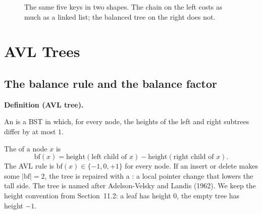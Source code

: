 \documentclass[11pt]{article}
\theoremstyle{definition}
\newenvironment{definitionbox}[1]{%
  \par\noindent\textbf{Definition (#1).}\ \itshape
}{\par\vspace{0.3em}}
\begin{document}
\begin{figure}[h]
  \centering
  \caption{The same five keys in two shapes. The chain on the left costs as
    much as a linked list; the balanced tree on the right does not.}
  \label{fig:chain}
\end{figure}

\section{AVL Trees}

\subsection{The balance rule and the balance factor}

\begin{definitionbox}{AVL tree}
An  is a BST in which, for every node, the heights of the left
and right subtrees differ by at most $1$.
\end{definitionbox}

The  of a node $x$ is
\[
  \mathrm{bf}(x) = \mathrm{height}(\text{left child of }x)
                 - \mathrm{height}(\text{right child of }x).
\]
The AVL rule is $\mathrm{bf}(x)\in\{-1,0,+1\}$ for every node. If an insert
or delete makes some $|\mathrm{bf}|=2$, the tree is repaired with a
: a local pointer change that lowers the tall side. The tree is
named after Adelson-Velsky and Landis (1962). We keep the height convention
from Section~11.2: a leaf has height $0$, the empty tree has height $-1$.
\end{document}
